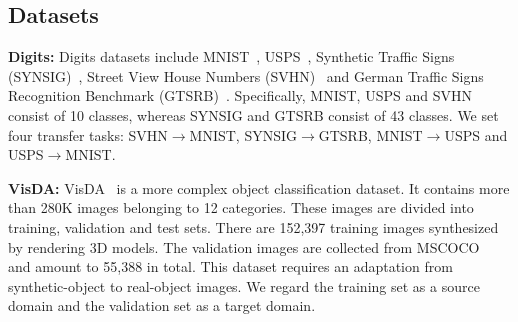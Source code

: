 \documentclass[journal,twocolumn]{IEEEtran}
\theoremstyle{definition}
\begin{document}
\subsection{Datasets}

{\bf Digits:} Digits datasets include MNIST~\cite{726791}, USPS~\cite{291440}, Synthetic Traffic Signs (SYNSIG)~\cite{10.1007/978-3-319-02895-8_52}, Street View House Numbers (SVHN)~\cite{37648} and German Traffic Signs Recognition Benchmark (GTSRB)~\cite{6033395}. Specifically, MNIST, USPS and SVHN consist of 10 classes, whereas SYNSIG and GTSRB consist of 43 classes. We set four transfer tasks: SVHN$\rightarrow$MNIST, SYNSIG$\rightarrow$GTSRB, MNIST$\rightarrow$USPS and USPS$\rightarrow$MNIST.

{\bf VisDA:} VisDA~\cite{peng2017visda:} is a more complex object classification dataset. It contains more than 280K images belonging to 12 categories. These images are divided into training, validation and test sets. There are 152,397 training images synthesized by rendering 3D models. The validation images are collected from MSCOCO~\cite{lin2014microsoft} and amount to 55,388 in total. This dataset requires an adaptation from synthetic-object to real-object images. We regard the training set as a source domain and the validation set as a target domain. 
\end{document}
